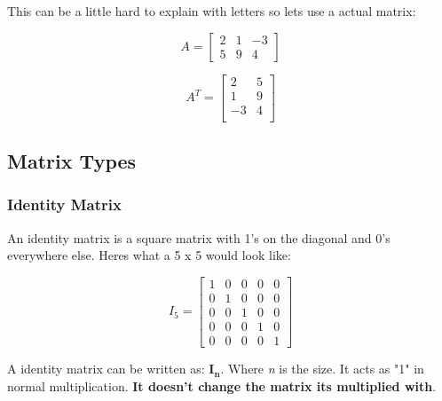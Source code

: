 \documentclass[12pt]{report}
\begin{document}
                This can be a little hard to explain with letters so lets use a actual matrix:

                \begin{equation}
                    A = \begin{bmatrix}
                        2 & 1 & -3 \\
                        5 & 9 & 4
                    \end{bmatrix}
                \end{equation}

                \begin{equation}
                    A^T = \begin{bmatrix}
                        2 & 5 \\
                        1 & 9 \\
                        -3 & 4 \\
                    \end{bmatrix}
                \end{equation}
        \subsection{Matrix Types}
            \subsubsection{Identity Matrix}
                An identity matrix is a square matrix with 1's on the diagonal and 0's everywhere else. Heres what a 5 x 5 would look like:

                \begin{equation}
                    I_5 = 
                    \begin{bmatrix}
                          1 & 0 & 0 & 0 & 0 \\
                          0 & 1 & 0 & 0 & 0 \\
                          0 & 0 & 1 & 0 & 0 \\
                          0 & 0 & 0 & 1 & 0 \\
                          0 & 0 & 0 & 0 & 1
                    \end{bmatrix}
                \end{equation}

                A identity matrix can be written as: $\mathbf{I_n}$. Where \emph{n} is the size. It acts as "1" in normal multiplication. \textbf{It doesn't change the matrix its multiplied with}.
\end{document}
